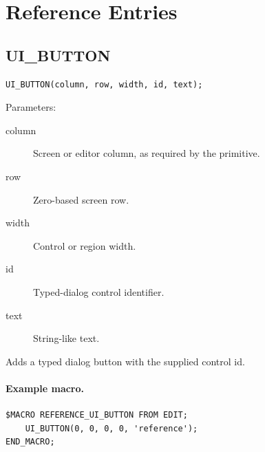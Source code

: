 \documentclass[a4paper,10pt,twoside,openany]{book}
\newenvironment{mrmacextension}{\begin{changebar}}{\end{changebar}}
\begin{document}
\section{Reference Entries}

\begin{mrmacextension}
\label{prim:procedure-ui-button}
\subsection*{UI\_BUTTON}
\begin{verbatim}
UI_BUTTON(column, row, width, id, text);
\end{verbatim}
Parameters:
\begin{description}
\item[column] Screen or editor column, as required by the primitive.
\item[row] Zero-based screen row.
\item[width] Control or region width.
\item[id] Typed-dialog control identifier.
\item[text] String-like text.
\end{description}

Adds a typed dialog button with the supplied control id.

\paragraph{Example macro.}
\begin{verbatim}
$MACRO REFERENCE_UI_BUTTON FROM EDIT;
    UI_BUTTON(0, 0, 0, 0, 'reference');
END_MACRO;
\end{verbatim}
\end{mrmacextension}
\end{document}
